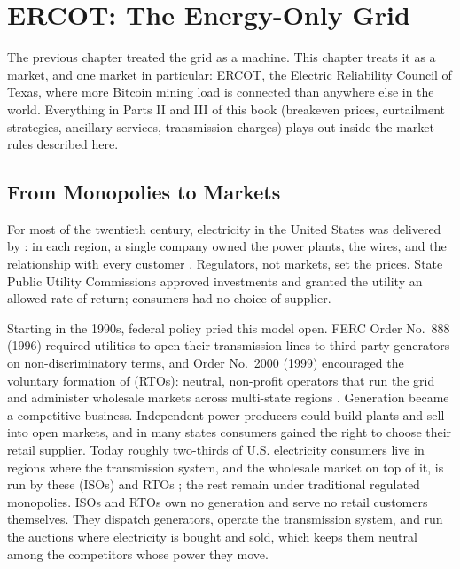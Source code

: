 \chapter{ERCOT: The Energy-Only Grid}
\label{ch:ercot}

The previous chapter treated the grid as a machine. This chapter treats it as a market, and one market in particular: ERCOT, the Electric Reliability Council of Texas, where more Bitcoin mining load is connected than anywhere else in the world. Everything in Parts II and III of this book (breakeven prices, curtailment strategies, ancillary services, transmission charges) plays out inside the market rules described here.

\section{From Monopolies to Markets}

For most of the twentieth century, electricity in the United States was delivered by : in each region, a single company owned the power plants, the wires, and the relationship with every customer \autocite{EPAMarketStructure}. Regulators, not markets, set the prices. State Public Utility Commissions approved investments and granted the utility an allowed rate of return; consumers had no choice of supplier.

Starting in the 1990s, federal policy pried this model open. FERC Order No.\ 888 (1996) required utilities to open their transmission lines to third-party generators on non-discriminatory terms, and Order No.\ 2000 (1999) encouraged the voluntary formation of  (RTOs): neutral, non-profit operators that run the grid and administer wholesale markets across multi-state regions \autocite{ferc1996order888,ferc1999order2000}. %
Generation became a competitive business. Independent power producers could build plants and sell into open markets, and in many states consumers gained the right to choose their retail supplier. Today roughly two-thirds of U.S. electricity consumers live in regions where the transmission system, and the wholesale market on top of it, is run by these  (ISOs) and RTOs \autocite{EPAMarketStructure}; %
 the rest remain under traditional regulated monopolies. ISOs and RTOs own no generation and serve no retail customers themselves. They dispatch generators, operate the transmission system, and run the auctions where electricity is bought and sold, which keeps them neutral among the competitors whose power they move.

